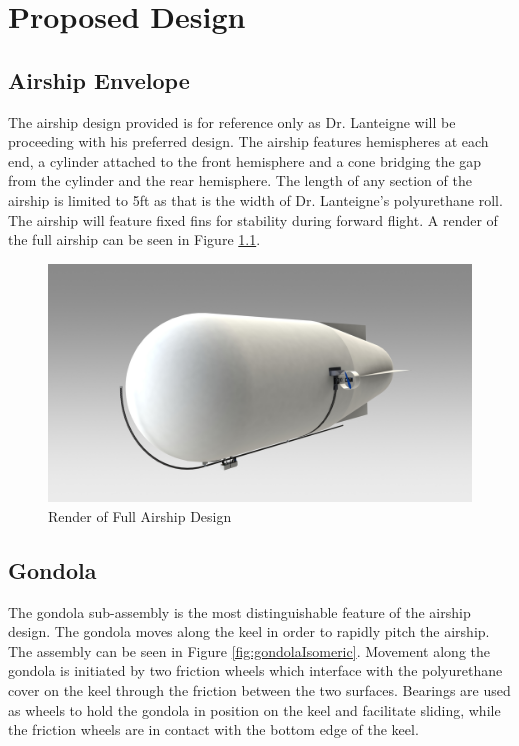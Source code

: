 \documentclass[../main.tex]{subfiles}
\begin{document}
\chapter{Proposed Design}
\section{Airship Envelope}
The airship design provided is for reference only as Dr. Lanteigne will be proceeding with his preferred design. The airship features hemispheres at each end, a cylinder attached to the front hemisphere and a cone bridging the gap from the cylinder and the rear hemisphere. The length of any section of the airship is limited to 5ft as that is the width of Dr. Lanteigne's polyurethane roll. The airship will feature fixed fins for stability during forward flight. A render of the full airship can be seen in Figure \ref{fig:fullAirship}. 

\begin{figure}[H]
	\centering
	\includegraphics[width=\textwidth]{img/design/fullAirshipPerspective.JPG}
	\caption{Render of Full Airship Design}
	\label{fig:fullAirship}
\end{figure}

\section{Gondola}
The gondola sub-assembly is the most distinguishable feature of the airship design. The gondola moves along the keel in order to rapidly pitch the airship. The assembly can be seen in  Figure \ref{fig:gondolaIsomeric}. Movement along the gondola is initiated by two friction wheels which interface with the polyurethane cover on the keel through the friction between the two surfaces. Bearings are used as wheels to hold the gondola in position on the keel and facilitate sliding, while the friction wheels are in contact with the bottom edge of the keel. 
\end{document}

